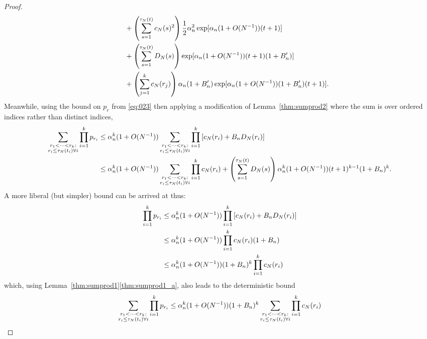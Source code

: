 \documentclass{article}
\newcommand{\1}[1]{\mathbbm{1}_{#1}}
\begin{document}
\begin{proof}
\begin{align}
    &\qquad+ \left( \sum_{s=1}^{\tau_N(t)} c_N(s)^2 \right)
        \frac{1}{2} \alpha_n^2 \exp[ \alpha_n (1+O(N^{-1})) (t+1) ] \notag\\
    &\qquad+ \left( \sum_{s=1}^{\tau_N(t)} D_N(s) \right)
        \exp[ \alpha_n (1+O(N^{-1})) (t+1) (1+B_n^\prime) ] \notag\\
    &\qquad+ \left( \sum_{j=1}^k c_N(r_j) \right)
        \alpha_n (1 + B_n^\prime)
        \exp[ \alpha_n (1+O(N^{-1})) (1 + B_n^\prime) (t+1) ] . \label{eq:034b}
\end{align}
Meanwhile, using the bound on $p_r$ from \eqref{eq:023} then applying a modification of Lemma~\ref{thm:sumprod2} where the sum is over ordered indices rather than distinct indices,
\begin{align}
\sum_{\substack{r_1 <\dots< r_k :\\ r_i \leq \tau_N(t_i) \forall i}}
        \prod_{i=1}^k p_{r_i}
&\leq \alpha_n^k (1+O(N^{-1})) 
        \sum_{\substack{r_1 <\dots< r_k :\\ r_i \leq \tau_N(t_i) \forall i}}
        \prod_{i=1}^k \left[ c_N(r_i) + B_n D_N(r_i) \right] \notag\\
&\leq \alpha_n^k (1+O(N^{-1}))
        \sum_{\substack{r_1 <\dots< r_k :\\ r_i \leq \tau_N(t_i) \forall i}}
        \prod_{i=1}^k c_N(r_i)
        + \left( \sum_{s=1}^{\tau_N(t)} D_N(s) \right)
        \alpha_n^k (1+O(N^{-1})) (t+1)^{k-1} (1+B_n)^k . \label{eq:035}
\end{align}
A more liberal (but simpler) bound can be arrived at thus:
\begin{align}
\prod_{i=1}^k p_{r_i}
&\leq \alpha_n^k (1+O(N^{-1})) 
        \prod_{i=1}^k \left[ c_N(r_i) + B_n D_N(r_i) \right] \notag\\
&\leq \alpha_n^k (1+O(N^{-1})) 
        \prod_{i=1}^k c_N(r_i) (1 + B_n) \notag\\
&\leq \alpha_n^k (1+O(N^{-1})) (1 + B_n)^k
        \prod_{i=1}^k c_N(r_i) 
\end{align}
which, using Lemma~\ref{thm:sumprod1}\ref{thm:sumprod1_a}, also leads to the deterministic bound
\begin{align}
\sum_{\substack{r_1 <\dots< r_k :\\ r_i \leq \tau_N(t_i) \forall i}}
        \prod_{i=1}^k p_{r_i}
&\leq \alpha_n^k (1+O(N^{-1})) (1 + B_n)^k
        \sum_{\substack{r_1 <\dots< r_k :\\ r_i \leq \tau_N(t_i) \forall i}}
        \prod_{i=1}^k c_N(r_i) \notag\\

\end{align}
\end{proof}
\end{document}
